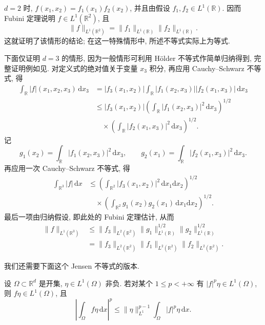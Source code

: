 \begin{Proof}
$d=2$ 时, $f(x_1,x_2)=f_1(x_1)f_2(x_2)$, 并且由假设 $f_1,f_2\in L^1(\mathbb{R})$. 因而 Fubini 定理说明 $f\in L^1(\mathbb{R}^2)$, 且
\[
  \|f\|_{L^1(\mathbb{R}^2)}
  =\|f_1\|_{L^1(\mathbb{R})}\|f_2\|_{L^1(\mathbb{R})}.
\]
这就证明了该情形的结论; 在这一特殊情形中, 所述不等式实际上为等式.

下面仅证明 $d=3$ 的情形, 因为一般情形可利用 Hölder 不等式作简单归纳得到, 完整证明例如见. 对定义式的绝对值关于变量 $x_3$ 积分, 再应用 Cauchy--Schwarz 不等式, 得
\begin{align*}
\int_{\mathbb{R}}|f|(x_1,x_2,x_3)\,\mathrm{d}x_3
&=|f_3(x_1,x_2)|
\int_{\mathbb{R}}|f_1(x_2,x_3)||f_2(x_1,x_3)|\,\mathrm{d}x_3\\
&\leq|f_3(x_1,x_2)|
\left(\int_{\mathbb{R}}|f_1(x_2,x_3)|^2\,\mathrm{d}x_3\right)^{1/2}\\
&\quad\times\left(\int_{\mathbb{R}}|f_2(x_1,x_3)|^2\,\mathrm{d}x_3\right)^{1/2}.
\end{align*}
记
\[
  g_1(x_2)=\int_{\mathbb{R}}|f_1(x_2,x_3)|^2\,\mathrm{d}x_3,
  \qquad
  g_2(x_1)=\int_{\mathbb{R}}|f_2(x_1,x_3)|^2\,\mathrm{d}x_3.
\]
再应用一次 Cauchy--Schwarz 不等式, 得
\begin{align*}
\int_{\mathbb{R}^3}|f|\,\mathrm{d}x
&\leq
\left(\int_{\mathbb{R}^2}|f_3(x_1,x_2)|^2\,\mathrm{d}x_1\mathrm{d}x_2\right)^{1/2}\\
&\quad\times
\left(\int_{\mathbb{R}^2}g_1(x_2)g_2(x_1)\,\mathrm{d}x_1\mathrm{d}x_2\right)^{1/2}.
\end{align*}
最后一项由归纳假设, 即此处的 Fubini 定理估计, 从而
\begin{align*}
\|f\|_{L^1(\mathbb{R}^3)}
&\leq\|f_3\|_{L^2(\mathbb{R}^2)}
\|g_1\|_{L^1(\mathbb{R})}^{1/2}
\|g_2\|_{L^1(\mathbb{R})}^{1/2}\\
&=\|f_3\|_{L^2(\mathbb{R}^2)}
\|f_1\|_{L^2(\mathbb{R}^2)}
\|f_2\|_{L^2(\mathbb{R}^2)}.
\end{align*}
\end{Proof}

我们还需要下面这个 Jensen 不等式的版本.

\begin{Proposition}
\label{prop:chap2-jensen-inequality}
设 $\Omega\subset\mathbb{R}^d$ 是开集, $\eta\in L^1(\Omega)$ 非负. 若对某个 $1\leq p<+\infty$ 有 $|f|^p\eta\in L^1(\Omega)$, 则 $f\eta\in L^1(\Omega)$, 且
\[
  \left|\int_\Omega f\eta\,\mathrm{d}x\right|^p
  \leq\|\eta\|_{L^1}^{p-1}\int_\Omega|f|^p\eta\,\mathrm{d}x.
\]
\end{Proposition}

